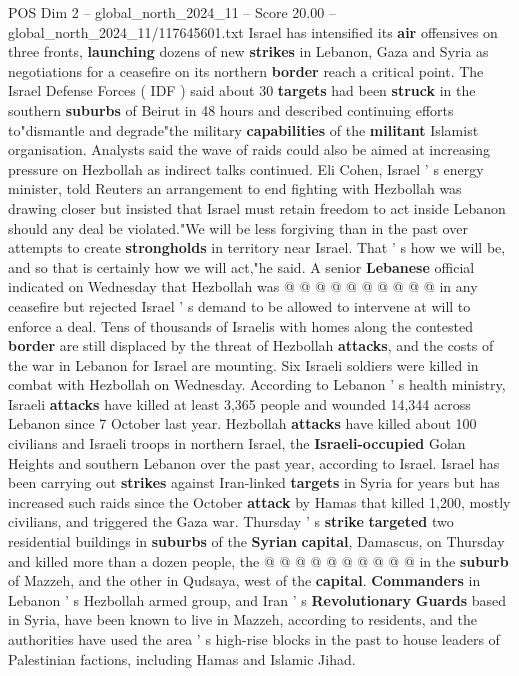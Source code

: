 \begin{textsample}{POS Dim 2 – global\_north\_2024\_11 – Score 20.00 – global\_north\_2024\_11/117645601.txt}  \label{ex:f2_pos_260}
Israel has intensified its \textbf{air} offensives on three fronts, \textbf{launching} dozens of new \textbf{strikes} in Lebanon, Gaza and Syria as negotiations for a ceasefire on its northern \textbf{border} reach a critical point.
The Israel Defense Forces ( IDF ) said about 30 \textbf{targets} had been \textbf{struck} in the southern \textbf{suburbs} of Beirut in 48 hours and described continuing efforts to"dismantle and degrade"the military \textbf{capabilities} of the \textbf{militant} Islamist organisation.
Analysts said the wave of raids could also be aimed at increasing pressure on Hezbollah as indirect talks continued.
Eli Cohen, Israel ' s energy minister, told Reuters an arrangement to end fighting with Hezbollah was drawing closer but insisted that Israel must retain freedom to act inside Lebanon should any deal be violated."We will be less forgiving than in the past over attempts to create \textbf{strongholds} in territory near Israel.
That ' s how we will be, and so that is certainly how we will act,"he said.
A senior \textbf{Lebanese} official indicated on Wednesday that Hezbollah was @ @ @ @ @ @ @ @ @ @ in any ceasefire but rejected Israel ' s demand to be allowed to intervene at will to enforce a deal.
Tens of thousands of Israelis with homes along the contested \textbf{border} are still displaced by the threat of Hezbollah \textbf{attacks}, and the costs of the war in Lebanon for Israel are mounting.
Six Israeli soldiers were killed in combat with Hezbollah on Wednesday.
According to Lebanon ' s health ministry, Israeli \textbf{attacks} have killed at least 3,365 people and wounded 14,344 across Lebanon since 7 October last year.
Hezbollah \textbf{attacks} have killed about 100 civilians and Israeli troops in northern Israel, the \textbf{Israeli-occupied} Golan Heights and southern Lebanon over the past year, according to Israel.
Israel has been carrying out \textbf{strikes} against Iran-linked \textbf{targets} in Syria for years but has increased such raids since the October \textbf{attack} by Hamas that killed 1,200, mostly civilians, and triggered the Gaza war.
Thursday ' s \textbf{strike} \textbf{targeted} two residential buildings in \textbf{suburbs} of the \textbf{Syrian} \textbf{capital}, Damascus, on Thursday and killed more than a dozen people, the @ @ @ @ @ @ @ @ @ @ in the \textbf{suburb} of Mazzeh, and the other in Qudsaya, west of the \textbf{capital}. \textbf{Commanders} in Lebanon ' s Hezbollah armed group, and Iran ' s \textbf{Revolutionary} \textbf{Guards} based in Syria, have been known to live in Mazzeh, according to residents, and the authorities have used the area ' s high-rise blocks in the past to house leaders of Palestinian factions, including Hamas and Islamic Jihad.

\end{textsample}

